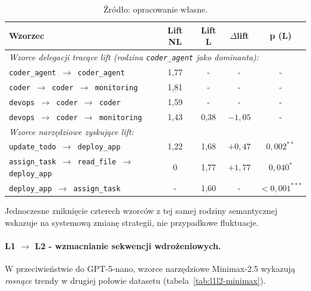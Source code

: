 \begin{table}[H]
    \centering
    \caption{Zmiany lift pomiędzy wariantami NL i L dla modelu Minimax-2.5 ($\Delta$lift). Myślnik (-) oznacza wzorzec nieobecny w danym wariancie (poniżej progu $n \geq 5$).}
    \label{tab:delta-lift-minimax}
    \footnotesize
    \begin{tabular}{p{}cccc}
        \hline
        \textbf{Wzorzec} & \textbf{Lift NL} & \textbf{Lift L} & \textbf{$\Delta$lift} & \textbf{p (L)} \\
        \hline
        \multicolumn{5}{l}{\textit{Wzorce delegacji tracące lift (rodzina \texttt{coder\_agent} jako dominanta):}} \\[2pt]
        \texttt{coder\_agent $\to$ coder\_agent}              & 1,77 & -     & -         & - \\
        \texttt{coder $\to$ coder $\to$ monitoring}           & 1,81 & -     & -         & - \\
        \texttt{devops $\to$ coder $\to$ coder}               & 1,59 & -     & -         & - \\
        \texttt{devops $\to$ coder $\to$ monitoring}          & 1,43 & 0,38 & $-1{,}05$ & - \\
        \hline
        \multicolumn{5}{l}{\textit{Wzorce narzędziowe zyskujące lift:}} \\[2pt]
        \texttt{update\_todo $\to$ deploy\_app}               & 1,22 & 1,68 & $+0{,}47$ & $0{,}002^{**}$ \\
        \texttt{assign\_task $\to$ read\_file $\to$ deploy\_app} & 0  & 1,77 & $+1{,}77$ & $0{,}040^{*}$ \\
        \texttt{deploy\_app $\to$ assign\_task}               & -     & 1,60 & -         & $<0{,}001^{***}$ \\
        \hline
    \end{tabular}
    \caption*{\footnotesize Źródło: opracowanie własne.}
\end{table}

Jednoczesne zniknięcie czterech wzorców z tej samej rodziny semantycznej wskazuje na systemową zmianę strategii, nie przypadkowe fluktuacje.

\paragraph{L1 $\to$ L2 - wzmacnianie sekwencji wdrożeniowych.}
W przeciwieństwie do GPT-5-nano, wzorce narzędziowe Minimax-2.5 wykazują \emph{rosnące} trendy w drugiej połowie datasetu (tabela~\ref{tab:l1l2-minimax}).

